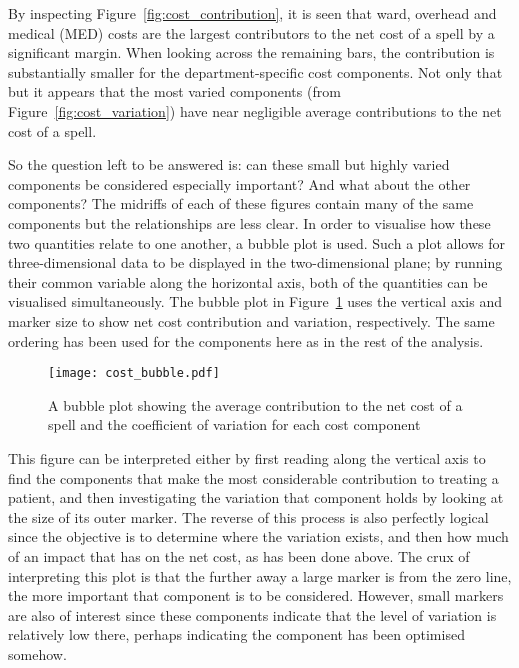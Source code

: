 By inspecting Figure~\ref{fig:cost_contribution}, it is seen that ward, overhead
and medical (MED) costs are the largest contributors to the net cost of a spell
by a significant margin. When looking across the remaining bars, the
contribution is substantially smaller for the department-specific cost
components. Not only that but it appears that the most varied components (from
Figure~\ref{fig:cost_variation}) have near negligible average contributions to
the net cost of a spell.

So the question left to be answered is: can these small but highly varied
components be considered especially important? And what about the other
components? The midriffs of each of these figures contain many of the same
components but the relationships are less clear. In order to visualise how these
two quantities relate to one another, a bubble plot is used. Such a plot allows
for three-dimensional data to be displayed in the two-dimensional plane; by
running their common variable along the horizontal axis, both of the quantities
can be visualised simultaneously. The bubble plot in
Figure~\ref{fig:cost_bubble} uses the vertical axis and marker size to show net
cost contribution and variation, respectively. The same ordering has been used
for the components here as in the rest of the analysis.

\begin{figure}
    \centering
    \texttt{[image: cost\_bubble.pdf]}
    \caption{%
        A bubble plot showing the average contribution to the net cost of a
        spell and the coefficient of variation for each cost component
    }\label{fig:cost_bubble}
\end{figure}

This figure can be interpreted either by first reading along the vertical axis
to find the components that make the most considerable contribution to treating
a patient, and then investigating the variation that component holds by looking
at the size of its outer marker. The reverse of this process is also perfectly
logical since the objective is to determine where the variation exists, and then
how much of an impact that has on the net cost, as has been done above. The crux
of interpreting this plot is that the further away a large marker is from the
zero line, the more important that component is to be considered. However, small
markers are also of interest since these components indicate that the level of
variation is relatively low there, perhaps indicating the component has been
optimised somehow.

